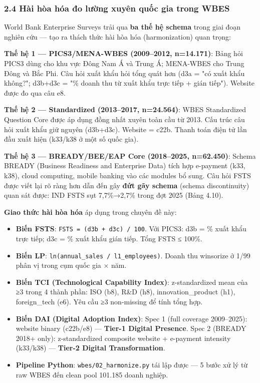 \documentclass[12pt,a4paper]{article}
\providecommand{\tightlist}{\setlength{\itemsep}{0pt}\setlength{\parskip}{0pt}}
\begin{document}
\hypertarget{24-huxe0i-huxf2a-huxf3a-ux111o-lux1b0ux1eddng-xuyuxean-quux1ed1c-gia-trong-wbes}{%
\subsubsection{2.4 Hài hòa hóa đo lường xuyên quốc gia trong
WBES}\label{24-huxe0i-huxf2a-huxf3a-ux111o-lux1b0ux1eddng-xuyuxean-quux1ed1c-gia-trong-wbes}}

World Bank Enterprise Surveys trải qua \textbf{ba thế hệ schema} trong
giai đoạn nghiên cứu --- tạo ra thách thức hài hòa hóa (harmonization)
quan trọng:

\textbf{Thế hệ 1 --- PICS3/MENA-WBES (2009--2012, n=14.171)}: Bảng hỏi
PICS3 dùng cho khu vực Đông Nam Á và Trung Á; MENA-WBES cho Trung Đông
và Bắc Phi. Câu hỏi xuất khẩu hỏi tổng quát hơn (d3a = "có xuất khẩu
không?"; d3b+d3c = "\% doanh thu từ xuất khẩu trực tiếp + gián tiếp").
Website được đo qua câu e8.

\textbf{Thế hệ 2 --- Standardized (2013--2017, n=24.564)}: WBES
Standardized Question Core được áp dụng đồng nhất xuyên toàn cầu từ
2013. Cấu trúc câu hỏi xuất khẩu giữ nguyên (d3b+d3c). Website = c22b.
Thanh toán điện tử lần đầu xuất hiện (k33/k38 ở một số quốc gia).

\textbf{Thế hệ 3 --- BREADY/BEE/EAP Core (2018--2025, n=62.450)}: Schema
BREADY (Business Readiness and Enterprise Data) tích hợp e-payment (k33,
k38), cloud computing, mobile banking vào các modules bổ sung. Câu hỏi
FSTS được viết lại rõ ràng hơn dẫn đến gây \textbf{đứt gãy schema}
(schema discontinuity) quan sát được: IND FSTS sụt 7,7\%→2,7\% trong đợt
2025 (Bảng 4.10).

\textbf{Giao thức hài hòa hóa} áp dụng trong chuyên đề này:

\begin{itemize}
\tightlist
\item
  \textbf{Biến FSTS}: \texttt{FSTS\ =\ (d3b\ +\ d3c)\ /\ 100}. Với
  PICS3: d3b = \% xuất khẩu trực tiếp; d3c = \% xuất khẩu gián tiếp.
  Tổng FSTS ≤ 100\%.
\item
  \textbf{Biến LP}: \texttt{ln(annual\_sales\ /\ l1\_employees)}. Doanh
  thu winsorize ở 1/99 phân vị trong cụm quốc gia × năm.
\item
  \textbf{Biến TCI (Technological Capability Index)}: z-standardized
  mean của ≥3 trong 4 thành phần: ISO (b8), R\&D (h8),
  innovation\_product (h1), foreign\_tech (e6). Yêu cầu ≥3 non-missing
  để tính tổng hợp.
\item
  \textbf{Biến DAI (Digital Adoption Index)}: Spec 1 (full coverage
  2009--2025): website binary (c22b/e8) --- \textbf{Tier-1 Digital
  Presence}. Spec 2 (BREADY 2018+ only): z-standardized composite
  website + e-payment intensity (k33/k38) --- \textbf{Tier-2 Digital
  Transformation}.
\item
  \textbf{Pipeline Python}: \texttt{wbes/02\_harmonize.py} tái lập được
  --- 5 bước xử lý từ raw WBES đến clean pool 101.185 doanh nghiệp.
\end{itemize}
\end{document}
